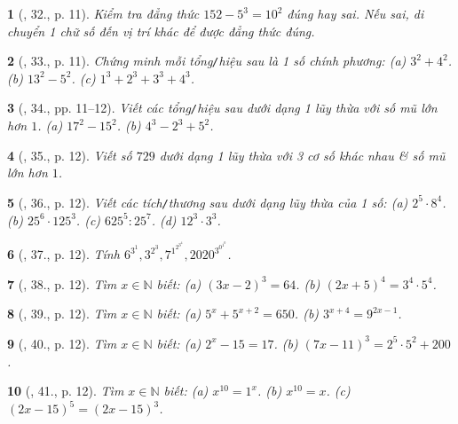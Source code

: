 \documentclass{article}
\newtheorem{baitoan}{}
\begin{document}
\begin{baitoan}[\cite{Tuyen_Toan_6}, 32., p. 11]
	Kiểm tra đẳng thức $152 - 5^3 = 10^2$ đúng hay sai. Nếu sai, di chuyển 1 chữ số đến vị trí khác để được đẳng thức đúng.
\end{baitoan}

\begin{baitoan}[\cite{Tuyen_Toan_6}, 33., p. 11]
	Chứng minh mỗi tổng{\tt/}hiệu sau là 1 số chính phương: (a) $3^2 + 4^2$. (b) $13^2 - 5^2$. (c) $1^3 + 2^3 + 3^3 + 4^3$.
\end{baitoan}

\begin{baitoan}[\cite{Tuyen_Toan_6}, 34., pp. 11--12]
	Viết các tổng{\tt/}hiệu sau dưới dạng 1 lũy thừa với số mũ lớn hơn $1$. (a) $17^2 - 15^2$. (b) $4^3 - 2^3 + 5^2$. 
\end{baitoan}

\begin{baitoan}[\cite{Tuyen_Toan_6}, 35., p. 12]
	Viết số $729$ dưới dạng 1 lũy thừa với 3 cơ số khác nhau \& số mũ lớn hơn $1$.
\end{baitoan}

\begin{baitoan}[\cite{Tuyen_Toan_6}, 36., p. 12]
	Viết các tích{\tt/}thương sau dưới dạng lũy thừa của 1 số: (a) $2^5\cdot8^4$. (b) $25^6\cdot125^3$. (c) $625^5:25^7$. (d) $12^3\cdot3^3$.
\end{baitoan}

\begin{baitoan}[\cite{Tuyen_Toan_6}, 37., p. 12]
	Tính $6^{3^1},3^{2^3},7^{1^{2^{3^4}}},2020^{3^{0^{1^0}}}$.
\end{baitoan}

\begin{baitoan}[\cite{Tuyen_Toan_6}, 38., p. 12]
	Tìm $x\in\mathbb{N}$ biết: (a) $(3x - 2)^3 = 64$. (b) $(2x + 5)^4 = 3^4\cdot5^4$.
\end{baitoan}

\begin{baitoan}[\cite{Tuyen_Toan_6}, 39., p. 12]
	Tìm $x\in\mathbb{N}$ biết: (a) $5^x + 5^{x + 2} = 650$. (b) $3^{x + 4} = 9^{2x - 1}$.
\end{baitoan}

\begin{baitoan}[\cite{Tuyen_Toan_6}, 40., p. 12]
	Tìm $x\in\mathbb{N}$ biết: (a) $2^x - 15 = 17$. (b) $(7x - 11)^3 = 2^5\cdot5^2 + 200$.
\end{baitoan}

\begin{baitoan}[\cite{Tuyen_Toan_6}, 41., p. 12]
	Tìm $x\in\mathbb{N}$ biết: (a) $x^{10} = 1^x$. (b) $x^{10} = x$. (c) $(2x - 15)^5 = (2x - 15)^3$.
\end{baitoan}
\end{document}
